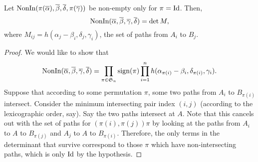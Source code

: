 	\begin{ftheo}
		Let $\operatorname{NonIn}(\pi(\overline{\alpha}),\overline{\beta},\overline{\delta},\pi(\overline{\gamma}))$ be non-empty only for $\pi = \operatorname{Id}$. Then,
		\[ \operatorname{NonIn}(\overline{\alpha},\overline{\beta},\overline{\gamma},\overline{\delta}) = \det M, \]
		where $M_{ij} = h(\alpha_j - \beta_i,\delta_j,\gamma_i)$, the set of paths from $A_i$ to $B_j$.
	\end{ftheo}
	\begin{proof}
		We would like to show that
		\[ \operatorname{NonIn}(\overline{\alpha},\overline{\beta},\overline{\gamma},\overline{\delta}) = \prod_{\pi \in \mathfrak{S}_n} \operatorname{sign}(\pi) \prod_{i=1}^n h(\alpha_{\pi(i)} - \beta_i , \delta_{\pi(i)} , \gamma_i). \]
		Suppose that according to some permutation $\pi$, some two paths from $A_i$ to $B_{\pi(i)}$ intersect. Consider the minimum intersecting pair index $(i,j)$ (according to the lexicographic order, say). Say the two paths intersect at $A$. Note that this cancels out with the set of paths for $(\pi(i), \pi(j)) \pi$ by looking at the paths from $A_i$ to $A$ to $B_{\pi(j)}$ and $A_j$ to $A$ to $B_{\pi(i)}$. Therefore, the only terms in the determinant that survive correspond to those $\pi$ which have non-intersecting paths, which is only $\operatorname{Id}$ by the hypothesis.
	\end{proof}

